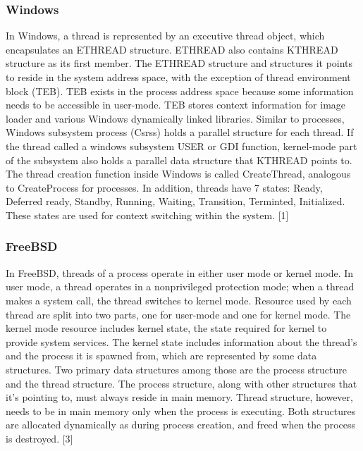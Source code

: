 \documentclass[10pt,a4paper]{article}
\begin{document}
\subsubsection{Windows}
In Windows, a thread is represented by an executive thread object, which encapsulates an ETHREAD structure. ETHREAD also contains KTHREAD structure as its first member. The ETHREAD structure and structures it points to reside in the system address space, with the exception of thread environment block (TEB). TEB exists in the process address space because some information needs to be accessible in user-mode. TEB stores context information for image loader and various Windows dynamically linked libraries. Similar to processes, Windows subsystem process (Csrss) holds a parallel structure for each thread. If the thread called a windows subsystem USER or GDI function, kernel-mode part of the subsystem also holds a parallel data structure that KTHREAD points to. The thread creation function inside Windows is called CreateThread, analogous to CreateProcess for processes. In addition, threads have 7 states: Ready, Deferred ready, Standby, Running, Waiting, Transition, Terminted, Initialized. These states are used for context switching within the system. [1]

\subsubsection{FreeBSD}
In FreeBSD, threads of a process operate in either user mode or kernel mode. In user mode, a thread operates in a nonprivileged protection mode; when a thread makes a system call, the thread switches to kernel mode. Resource used by each thread are split into two parts, one for user-mode and one for kernel mode. The kernel mode resource includes kernel state, the state required for kernel to provide system services. The kernel state includes information about the thread’s and the process it is spawned from, which are represented by some data structures. Two primary data structures among those are the process structure and the thread structure. The process structure, along with other structures that it’s pointing to, must always reside in main memory. Thread structure, however, needs to be in main memory only when the process is executing. Both structures are allocated dynamically as during process creation, and freed when the process is destroyed. [3]
\end{document}
